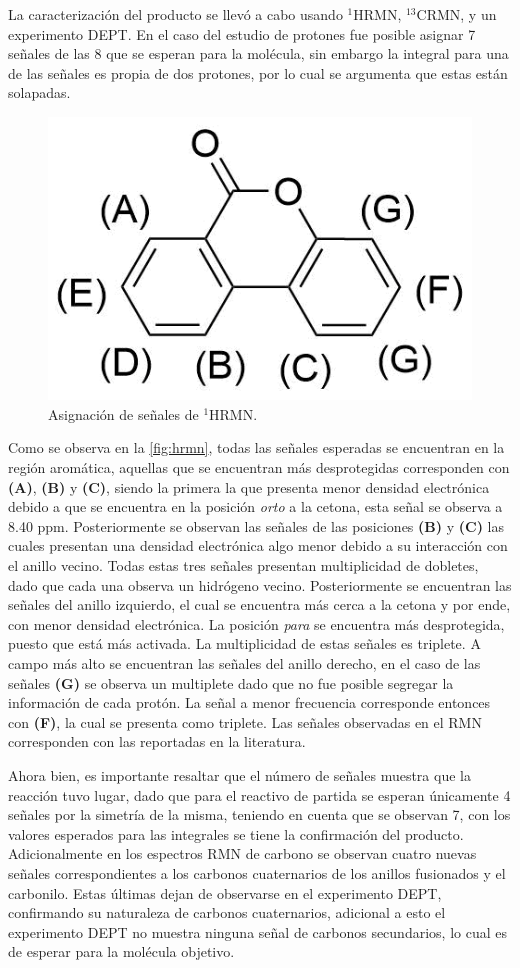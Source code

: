\documentclass[fleqn,11pt]{SelfArx}
\begin{document}
	La caracterización del producto se llevó a cabo usando $^{1}$HRMN, $^{13}$CRMN, y un experimento DEPT. En el caso del estudio de protones fue posible asignar 7 señales de las 8 que se esperan para la molécula, sin embargo la integral para una de las señales es propia de dos protones, por lo cual se argumenta que estas están solapadas.
	\begin{figure}[h]
		\centering
		\includegraphics[width=0.5\linewidth]{structures/H.png}
		\caption{Asignación de señales de $^{1}$HRMN.}
		\label{fig:hrmn}
	\end{figure}

	Como se observa en la \autoref{fig:hrmn}, todas las señales esperadas se encuentran en la región aromática, aquellas que se encuentran más desprotegidas corresponden con \textbf{(A)}, \textbf{(B)} y \textbf{(C)}, siendo la primera la que presenta menor densidad electrónica debido a que se encuentra en la posición \textit{orto} a la cetona, esta señal se observa a 8.40 ppm. Posteriormente se observan las señales de las posiciones \textbf{(B)} y \textbf{(C)} las cuales presentan una densidad electrónica algo menor debido a su interacción con el anillo vecino. Todas estas tres señales presentan multiplicidad de dobletes, dado que cada una observa un hidrógeno vecino. Posteriormente se encuentran las señales del anillo izquierdo, el cual se encuentra más cerca a la cetona y por ende, con menor densidad electrónica. La posición \textit{para} se encuentra más desprotegida, puesto que está más activada. La multiplicidad de estas señales es triplete. A campo más alto se encuentran las señales del anillo derecho, en el caso de las señales \textbf{(G)} se observa un multiplete dado que no fue posible segregar la información de cada protón. La señal a menor frecuencia corresponde entonces con \textbf{(F)}, la cual se presenta como triplete. Las señales observadas en el RMN corresponden con las reportadas en la literatura\cite{doi:10.1021/ol400877q}.	
	\newpage
	
	Ahora bien, es importante resaltar que el número de señales muestra que la reacción tuvo lugar, dado que para el reactivo de partida se esperan únicamente 4 señales por la simetría de la misma, teniendo en cuenta que se observan 7, con los valores esperados para las integrales se tiene la confirmación del producto. Adicionalmente en los espectros RMN de carbono se observan cuatro nuevas señales correspondientes a los carbonos cuaternarios de los anillos fusionados y el carbonilo. Estas últimas dejan de observarse en el experimento DEPT, confirmando su naturaleza de carbonos cuaternarios, adicional a esto el experimento DEPT no muestra ninguna señal de carbonos secundarios, lo cual es de esperar para la molécula objetivo.
	
\end{document}
